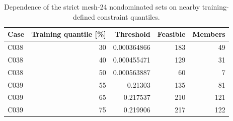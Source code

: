 \begin{table}[t]
\centering\small
\caption{Dependence of the strict mesh-24 nondominated sets on nearby training-defined constraint quantiles.}
\label{tab:threshold_sensitivity_fast}
\begin{tabular}{lrrrr}
\toprule
Case & Training quantile [\%] & Threshold & Feasible & Members \\
\midrule
C038 & 30 & 0.000364866 & 183 & 49 \\
C038 & 40 & 0.000455471 & 129 & 31 \\
C038 & 50 & 0.000563887 & 60 & 7 \\
C039 & 55 & 0.21303 & 135 & 81 \\
C039 & 65 & 0.217537 & 210 & 121 \\
C039 & 75 & 0.219906 & 217 & 122 \\
\bottomrule
\end{tabular}
\end{table}
